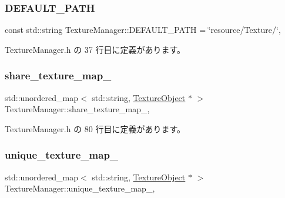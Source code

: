\subsubsection{\texorpdfstring{D\+E\+F\+A\+U\+L\+T\+\_\+\+P\+A\+TH}{DEFAULT\_PATH}}
{\footnotesize\ttfamily const std\+::string Texture\+Manager\+::\+D\+E\+F\+A\+U\+L\+T\+\_\+\+P\+A\+TH = \char`\"{}resource/Texture/\char`\"{}\hspace{0.3cm}{\ttfamily [static]}, {\ttfamily [private]}}



 Texture\+Manager.\+h の 37 行目に定義があります。

\mbox{\label{class_texture_manager_a8488bb78ab5b797291a5a82e33da3486}} 
\subsubsection{\texorpdfstring{share\+\_\+texture\+\_\+map\+\_\+}{share\_texture\_map\_}}
{\footnotesize\ttfamily std\+::unordered\+\_\+map$<$ std\+::string, \mbox{\hyperlink{class_texture_object}{Texture\+Object}} $\ast$ $>$ Texture\+Manager\+::share\+\_\+texture\+\_\+map\+\_\+\hspace{0.3cm}{\ttfamily [static]}, {\ttfamily [private]}}



 Texture\+Manager.\+h の 80 行目に定義があります。

\mbox{\label{class_texture_manager_af9d3a68306acf224380084508ee2fbdd}} 
\subsubsection{\texorpdfstring{unique\+\_\+texture\+\_\+map\+\_\+}{unique\_texture\_map\_}}
{\footnotesize\ttfamily std\+::unordered\+\_\+map$<$ std\+::string, \mbox{\hyperlink{class_texture_object}{Texture\+Object}} $\ast$ $>$ Texture\+Manager\+::unique\+\_\+texture\+\_\+map\+\_\+\hspace{0.3cm}{\ttfamily [static]}, {\ttfamily [private]}}




